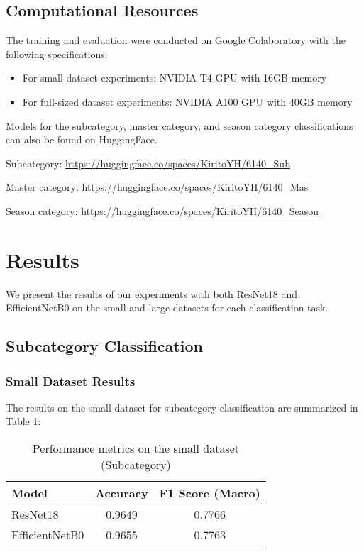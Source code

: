 \documentclass[10pt,journal,compsoc]{IEEEtran}
\begin{document}
\subsection{Computational Resources}
The training and evaluation were conducted on Google Colaboratory with the following specifications:

\begin{itemize}
\item For small dataset experiments: NVIDIA T4 GPU with 16GB memory
\item For full-sized dataset experiments: NVIDIA A100 GPU with 40GB memory
\end{itemize}

Models for the subcategory, master category, and season category classifications can also be found on HuggingFace.

Subcategory: \url{https://huggingface.co/spaces/KiritoYH/6140_Sub}

Master category: \url{https://huggingface.co/spaces/KiritoYH/6140_Mas}

Season category: \url{https://huggingface.co/spaces/KiritoYH/6140_Season}

\section{Results}
We present the results of our experiments with both ResNet18 and EfficientNetB0 on the small and large datasets for each classification task.

\subsection{Subcategory Classification}

\subsubsection{Small Dataset Results}
The results on the small dataset for subcategory classification are summarized in Table 1:

\begin{table}[htbp]
\centering
\caption{Performance metrics on the small dataset (Subcategory)}
\begin{tabular}{|l|c|c|}
\hline
\textbf{Model} & \textbf{Accuracy} & \textbf{F1 Score (Macro)} \\
\hline
ResNet18 & 0.9649 & 0.7766 \\
\hline
EfficientNetB0 & 0.9655 & 0.7763 \\
\hline
\end{tabular}
\end{table}
\end{document}
